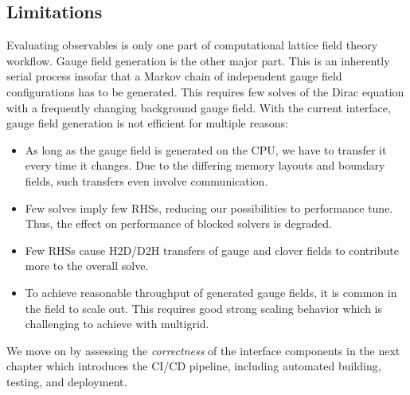\subsection{Limitations}

Evaluating observables is only one part of computational lattice field theory workflow.
Gauge field generation is the other major part.
This is an inherently serial process insofar that a Markov chain of independent gauge field configurations has to be generated.
This requires few solves of the Dirac equation with a frequently changing background gauge field.
With the current interface, gauge field generation is not efficient for multiple reasons:
\begin{itemize}
    \item As long as the gauge field is generated on the CPU, we have to transfer it every time it changes. Due to the differing memory layouts and boundary fields, such transfers even involve communication.
    \item Few solves imply few RHSs, reducing our possibilities to performance tune. Thus, the effect on performance of blocked solvers is degraded.
    \item Few RHSs cause H2D/D2H transfers of gauge and clover fields to contribute more to the overall solve.
    \item To achieve reasonable throughput of generated gauge fields, it is common in the field to scale out. This requires good strong scaling behavior which is challenging to achieve with multigrid.
\end{itemize}

We move on by assessing the \emph{correctness} of the interface components in the next chapter which introduces the CI/CD pipeline, including automated building, testing, and deployment.



